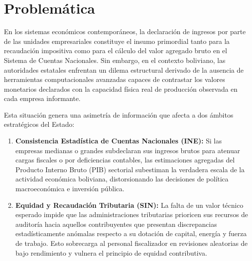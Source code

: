 \section{Problemática}
\label{sec:problematica}

En los sistemas económicos contemporáneos, la declaración de ingresos por parte de las unidades empresariales constituye el insumo primordial tanto para la recaudación impositiva como para el cálculo del valor agregado bruto en el Sistema de Cuentas Nacionales. Sin embargo, en el contexto boliviano, las autoridades estatales enfrentan un dilema estructural derivado de la ausencia de herramientas computacionales avanzadas capaces de contrastar los valores monetarios declarados con la capacidad física real de producción observada en cada empresa informante.

Esta situación genera una asimetría de información que afecta a dos ámbitos estratégicos del Estado:
\begin{enumerate}
    \item \textbf{Consistencia Estadística de Cuentas Nacionales (INE):} Si las empresas medianas o grandes subdeclaran sus ingresos brutos para atenuar cargas fiscales o por deficiencias contables, las estimaciones agregadas del Producto Interno Bruto (PIB) sectorial subestiman la verdadera escala de la actividad económica boliviana, distorsionando las decisiones de política macroeconómica e inversión pública.
    \item \textbf{Equidad y Recaudación Tributaria (SIN):} La falta de un valor técnico esperado impide que las administraciones tributarias prioricen sus recursos de auditoría hacia aquellos contribuyentes que presentan discrepancias estadísticamente anómalas respecto a su dotación de capital, energía y fuerza de trabajo. Esto sobrecarga al personal fiscalizador en revisiones aleatorias de bajo rendimiento y vulnera el principio de equidad contributiva.
\end{enumerate}

